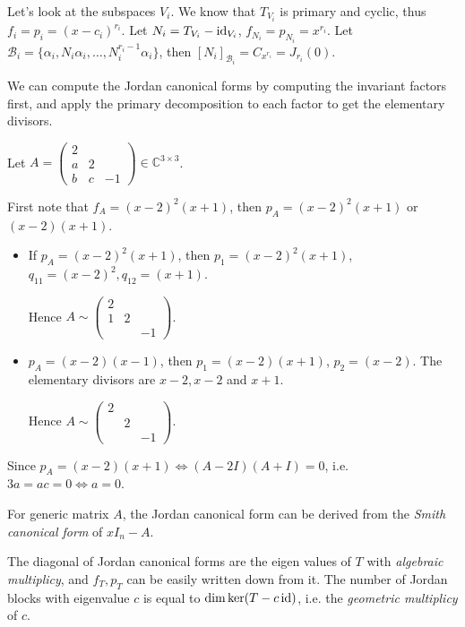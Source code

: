 Let's look at the subspaces $V_i$. We know that $T_{V_i}$ is
primary and cyclic, thus $f_i = p_i = (x-c_i)^{r_i}$.
Let $N_i = T_{V_i} - \operatorname{id}_{V_i}$, $f_{N_i} = p_{N_i} = x^{r_i}$.
Let $\mathcal{B}_i = \{\alpha_i, N_i\alpha_i,\dots, N_i^{r_i-1}\alpha_i\}$,
then $[N_i]_{\mathcal{B}_i} = C_{x^{r_i}} = J_{r_i}(0)$.

We can compute the Jordan canonical forms by computing the invariant factors first,
and apply the primary decomposition to each factor to get the elementary divisors.

\begin{example}
    Let $A = \begin{pmatrix}
		2\\ a &2 \\ b &c &-1
    \end{pmatrix}
    \in \mathbb{C}^{3\times 3}$.

	First note that $f_A = (x-2)^2(x+1)$,
	then $p_A = (x-2)^2(x+1)$ or $(x-2)(x+1)$.

	\begin{itemize}
		\item If $p_A = (x-2)^2(x+1)$, then $p_1 = (x-2)^2(x+1)$,
			$q_{11} = (x-2)^2, q_{12} = (x+1)$.

			Hence $A \sim \begin{pmatrix} 2\\1&2\\&&-1 \end{pmatrix}$.
		\item $p_A = (x-2)(x-1)$, then $p_1 = (x-2)(x+1)$, $p_2 = (x-2)$.
			The elementary divisors are $x-2, x-2$ and $x+1$.

			Hence $A\sim \begin{pmatrix} 2\\&2\\&&-1 \end{pmatrix}$.
	\end{itemize}

	Since $p_A = (x-2)(x+1)\iff (A-2I)(A+I) = 0$,
	i.e. $3a = ac = 0\iff a = 0$.
\end{example}
\begin{remark}
    For generic matrix $A$, the Jordan canonical form can be derived from
	the \textit{Smith canonical form} of $xI_n - A$.
\end{remark}

The diagonal of Jordan canonical forms are the eigen values of $T$ with
\textit{algebraic multiplicy}, and $f_T, p_T$ can be easily written down from it.
The number of Jordan blocks with eigenvalue $c$ is equal to $\dim\ker(T - c\operatorname{id})$,
i.e. the \textit{geometric multiplicy} of $c$.

